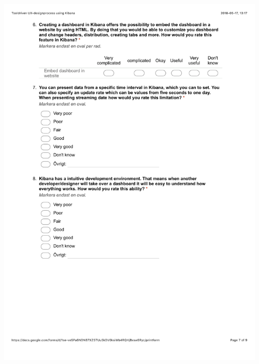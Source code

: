 \documentclass[12pt]{kththesis}
\begin{document}
\begin{appendices}
\includegraphics[width=1\textwidth]{UX_designprocess7.pdf}

\end{appendices}
\end{document}
